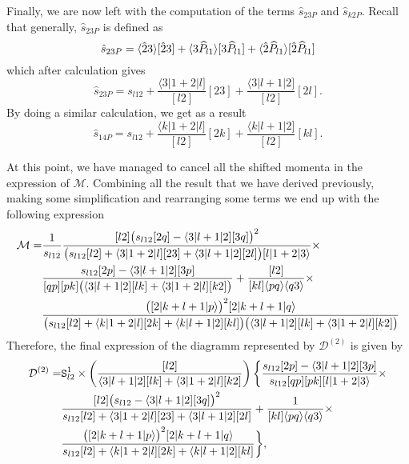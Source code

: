 Finally, we are now left with the computation of the terms $\hat{s}_{23P}$ and $\hat{s}_{k2P}$. Recall that generally, $\hat{s}_{23P}$ is defined as 
\begin{equation}
\hat{s}_{23P}=\langle\hat{2}3\rangle [\hat{2}3]+\langle3\widehat{P}_{l1}\rangle [3\widehat{P}_{l1}]+\langle\hat{2}\widehat{P}_{l1}\rangle [\hat{2} \widehat{P}_{l1}]
\end{equation}
which after calculation gives
\begin{equation}
\hat{s}_{23P}=s_{l12}+ \frac{\langle 3\vert 1+2\vert l]}{[l2]} [23] +\frac{\langle 3\vert l+1\vert 2]}{[l2]} [2l].
\end{equation}
By doing a similar calculation, we get as a result
\begin{equation}
\hat{s}_{14P} = s_{l12}+ \frac{\langle k\vert 1+2\vert l]}{[l2]} [2k] +\frac{\langle k\vert l+1\vert 2]}{[l2]} [kl].
\end{equation}

At this point, we have managed to cancel all the shifted momenta in the expression of $\mathcal{M}$. Combining all the result that we have derived previously, making some simplification and rearranging some terms we end up with the following expression
\begin{align}
\mathcal{M} =& \frac{1}{s_{l12}} \frac{[l2] \big( s_{l12} [2q] - \langle 3\vert l+1\vert 2][3q] \big)^2}{\big( s_{l12} [l2]+ \langle 3\vert 1+2\vert l][23]+ \langle 3\vert l+1\vert 2][2l] \big) [l\vert 1+2\vert 3\rangle} \times \nonumber \\
& \frac{s_{l12} [2p] - \langle 3\vert l+1\vert 2] [3p]}{[qp] [pk] \big( \langle 3\vert l+1\vert 2][lk]+ \langle 3\vert 1+2\vert l][k2] \big)}  + \frac{[l2]}{[kl] \langle pq\rangle \langle q3\rangle} \times \nonumber \\
& \frac{\big( [2\vert k+l+1\vert p\rangle \big)^2 [2\vert k+l+1\vert q\rangle}{\big( s_{l12} [l2]+ \langle k\vert 1+2\vert l][2k]+ \langle k\vert l+1\vert 2][kl] \big) \big( \langle 3\vert l+1\vert 2][lk]+ \langle 3\vert 1+2\vert l][k2] \big)}
\end{align} 
Therefore, the final expression of the diagramm represented by $\mathcal{D}^{(2)}$ is given by
\begin{align}
\mathcal{D}^{(2)} =& \mathtt{S}^1_{l2} \times \left( \frac{[l2]}{\langle 3\vert l+1\vert 2][lk]+ \langle 3\vert 1+2\vert l][k2]} \right) \bigg\lbrace \frac{s_{l12} [2p] - \langle 3\vert l+1\vert 2] [3p]}{s_{l12} [qp] [pk]  [l\vert 1+2\vert 3\rangle} \times \nonumber \\
& \frac{[l2] \big( s_{l12} - \langle 3\vert l+1\vert 2][3q] \big)^2}{ s_{l12} [l2]+ \langle 3\vert 1+2\vert l][23]+ \langle 3\vert l+1\vert 2][2l]}+ \frac{1}{[kl] \langle pq\rangle \langle q3\rangle} \times \nonumber \\
& \frac{\big( [2\vert k+l+1\vert p\rangle \big)^2 [2\vert k+l+1\vert q\rangle}{s_{l12} [l2]+ \langle k\vert 1+2\vert l][2k]+ \langle k\vert l+1\vert 2][kl]} \bigg\rbrace ,
\end{align}